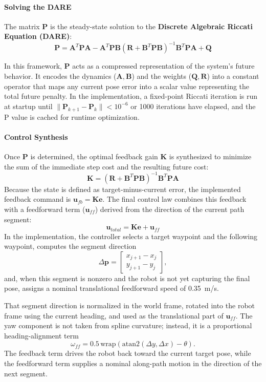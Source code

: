 \documentclass[11pt]{article}
\begin{document}
\paragraph{Solving the DARE}
The matrix $\mathbf{P}$ is the steady-state solution to the \textbf{Discrete Algebraic Riccati Equation (DARE)}:
\[
\mathbf{P} = \mathbf{A}^T\mathbf{P}\mathbf{A} - \mathbf{A}^T\mathbf{P}\mathbf{B} \left(
\mathbf{R}+\mathbf{B}^T\mathbf{P}\mathbf{B} \right)^{-1} \mathbf{B}^T\mathbf{P}\mathbf{A} + \mathbf{Q}
\]

In this framework, $\mathbf{P}$ acts as a compressed representation of the system's future behavior. It encodes the
dynamics ($\mathbf{A}, \mathbf{B}$) and the weights ($\mathbf{Q}, \mathbf{R}$) into a constant operator that maps any
current pose error into a scalar value representing the total future penalty. In the implementation, a fixed-point Riccati iteration is run at startup until $\lVert
\mathbf{P}_{k+1} - \mathbf{P}_k \rVert < 10^{-6}$ or 1000 iterations have elapsed, and the P value is cached for runtime optimization.

\paragraph{Control Synthesis}
Once $\mathbf{P}$ is determined, the optimal feedback gain $\mathbf{K}$ is synthesized to minimize the sum of the
immediate step cost and the resulting future cost:
\[
\mathbf{K} = \left( \mathbf{R}+\mathbf{B}^T\mathbf{P}\mathbf{B} \right)^{-1} \mathbf{B}^T\mathbf{P}\mathbf{A}
\]
Because the state is defined as target-minus-current error, the implemented feedback command is \(\mathbf{u}_{fb} =
\mathbf{K}\mathbf{e}\). The final control law combines this feedback with a feedforward term ($\mathbf{u}_{ff}$) derived
from the direction of the current path segment:
\[
\mathbf{u}_{total} = \mathbf{K}\mathbf{e} + \mathbf{u}_{ff}
\]
In the implementation, the controller selects a target waypoint and the following waypoint, computes the segment
direction
\[
\Delta \mathbf{p} =
\begin{bmatrix}
x_{j+1} - x_j \\
y_{j+1} - y_j
\end{bmatrix},
\]
and, when this segment is nonzero and the robot is not yet capturing the final pose, assigns a nominal translational
feedforward speed of \SI{0.35}{m/s}. 

That segment direction is normalized in the world frame, rotated into the robot frame using the current heading, and
used as the translational part of $\mathbf{u}_{ff}$. The yaw component is not taken from spline curvature; instead, it
is a proportional heading-alignment term
\[
\omega_{ff} = 0.5 \,\mathrm{wrap}\!\left(\mathrm{atan2}(\Delta y,\Delta x) - \theta\right).
\]
The feedback term drives the robot back toward the current target pose, while the feedforward term supplies a nominal
along-path motion in the direction of the next segment.
\end{document}

